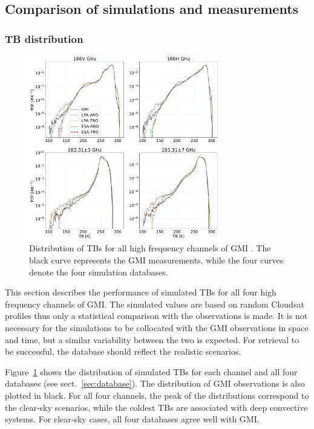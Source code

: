 \documentclass[amt, manuscript]{copernicus}
\begin{document}
\subsection{Comparison of simulations and measurements}

\subsubsection{TB distribution}

\begin{figure}[t]
	\includegraphics[width=8.3cm]{Figures/PDF_TB_jan.pdf}
	\caption{Distribution of TBs for all high frequency channels of GMI . The black curve represents the GMI measurements, while the four curves denote the four simulation databases.}
	\label{fig:hist_TB}
\end{figure}

This section describes the performance of simulated TBs for all four high frequency channels of GMI. The simulated values are based on random Cloudsat profiles thus only a statistical comparison with the observations is made. It is not necessary for the simulations to be collocated with the GMI observations in space and time, but a similar variability between the two is expected. For retrieval to be successful, the database should reflect the realistic scenarios. 


Figure~\ref{fig:hist_TB} shows the distribution of simulated TBs for each channel and all four databases (see sect.~\ref{sec:database}). The distribution of GMI observations is also plotted in black. For all four channels, the peak of the distributions correspond to the clear-sky scenarios, while the coldest TBs are associated with deep convective systems. For clear-sky cases, all four databases agree well with GMI.
\end{document}
